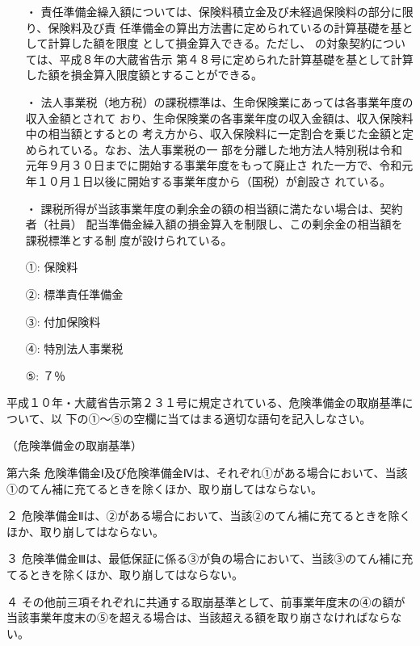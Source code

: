 \documentclass[report,gutter=10mm,fore-edge=10mm,uplatex,dvipdfmx]{jlreq}
\begin{document}
\begin{itemize}
\item[・] 責任準備金繰入額については、保険料積立金及び未経過保険料の部分に限り、保険料及び責
任準備金の算出方法書に定められているの計算基礎を基として計算した額を限度
として損金算入できる。ただし、
の対象契約については、平成８年の大蔵省告示
第４８号に定められた計算基礎を基として計算した額を損金算入限度額とすることができる。
\item[・] 法人事業税（地方税）の課税標準は、生命保険業にあっては各事業年度の収入金額とされて
おり、生命保険業の各事業年度の収入金額は、収入保険料中の相当額とするとの
考え方から、収入保険料に一定割合を乗じた金額と定められている。なお、法人事業税の一
部を分離した地方法人特別税は令和元年９月３０日までに開始する事業年度をもって廃止さ
れた一方で、令和元年１０月１日以後に開始する事業年度から（国税）が創設さ
れている。
\item[・] 課税所得が当該事業年度の剰余金の額の相当額に満たない場合は、契約者（社員）
配当準備金繰入額の損金算入を制限し、この剰余金の相当額を課税標準とする制
度が設けられている。
\end{itemize}
\answer{}
\begin{itemize}
\item[ ①: ] 保険料
\item[ ②: ] 標準責任準備金
\item[ ③: ] 付加保険料
\item[ ④: ] 特別法人事業税
\item[ ⑤: ] ７％
\end{itemize}



平成１０年・大蔵省告示第２３１号に規定されている、危険準備金の取崩基準について、以
下の①～⑤の空欄に当てはまる適切な語句を記入しなさい。

（危険準備金の取崩基準）

第六条 危険準備金Ⅰ及び危険準備金Ⅳは、それぞれ①がある場合において、当該
①のてん補に充てるときを除くほか、取り崩してはならない。

２ 危険準備金Ⅱは、②がある場合において、当該②のてん補に充てるときを除くほか、取り崩してはならない。

３ 危険準備金Ⅲは、最低保証に係る③が負の場合において、当該③のてん補に充てるときを除くほか、取り崩してはならない。

４ その他前三項それぞれに共通する取崩基準として、前事業年度末の④の額が当該事業年度末の⑤を超える場合は、当該超える額を取り崩さなければならない。
\end{document}
